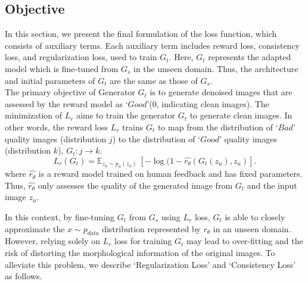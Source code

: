 \documentclass[lettersize,journal]{IEEEtran}
\begin{document}
\subsection{Objective}
In this section, we present the final formulation of the loss function, which consists of auxiliary terms. Each auxiliary term includes reward loss, consistency loss, and regularization loss, used to train $G_t$. Here, $G_t$ represents the adapted model which is fine-tuned from $G_s$ in the unseen domain. Thus, the architecture and initial parameters of $G_t$ are the same as those of $G_s$. \\

 The primary objective of Generator $G_t$ is to generate denoised images that are assessed by the reward model as `$Good$'(0, indicating clean images). The minimization of $L_r$ aims to train the generator $G_t$ to generate clean images. In other words, the reward loss $L_r$ trains $G_t$ to map from the distribution of `$Bad$' quality images (distribution $j$) to the distribution of `$Good$' quality images (distribution $k$), $G_t: j\rightarrow k$.
\begin{equation}
\label{Lr_loss}
L_{r}(G_t) = \mathbb{E}_{z_u\sim p_n(z_u)} \ [-\log{(1-\hat{r_\theta}(G_t(z_u), z_u)}].
\end{equation}
where $\hat{r_\theta}$ is a reward model trained on human feedback and has fixed parameters. Thus, $\hat{r_\theta}$ only assesses the quality of the generated image from $G_t$ and the input image $z_u$.

In this context, by fine-tuning $G_t$ from $G_s$ using $L_r$ loss, $G_t$ is able to closely approximate the $x\sim p_{data}$ distribution represented by $r_\theta$ in an unseen domain. However, relying solely on $L_r$ loss for training $G_t$ may lead to over-fitting and the risk of distorting the morphological information of the original images. To alleviate this problem, we describe `Regularization Loss' and `Consistency Loss' as follows.\\
\end{document}
